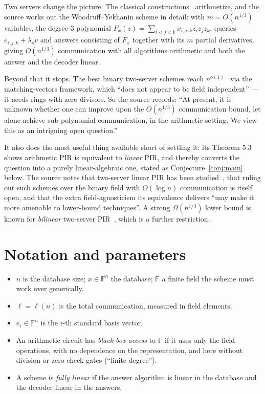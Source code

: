 \documentclass{aicr-conjecture}
\newcommand{\F}{\mathbb{F}}
\begin{document}
Two servers change the picture. The classical
constructions~\cite{CGKS95,BIK05,WY05} arithmetize, and the source works
out the Woodruff--Yekhanin scheme in detail: with $m = O(n^{1/3})$
variables, the degree-$3$ polynomial $F_{x}(z) = \sum_{i<j<k} x_{i,j,k}
z_{i} z_{j} z_{k}$, queries $e_{i,j,k} + \lambda_{s} v$ and answers
consisting of $F_{x}$ together with its $m$ partial derivatives, giving
$O(n^{1/3})$ communication with all algorithms arithmetic and both the
answer and the decoder linear.

Beyond that it stops. The best binary two-server schemes reach
$n^{o(1)}$~\cite{DG15,ABL25} via the matching-vectors framework, which
``does not appear to be field independent'' --- it needs rings with zero
divisors. So the source records: ``At present, it is unknown whether one
can improve upon the $O(n^{1/3})$ communication bound, let alone achieve
sub-polynomial communication, in the arithmetic setting. We view this as
an intriguing open question.''

It also does the most useful thing available short of settling it: its
Theorem 5.3 shows arithmetic PIR is equivalent to \emph{linear} PIR, and
thereby converts the question into a purely linear-algebraic one, stated
as Conjecture~\ref{conj:main} below. The source notes that two-server
linear PIR has been studied~\cite{GKST02,DS07}, that ruling out such
schemes over the binary field with $O(\log n)$ communication is itself
open, and that the extra field-agnosticism its equivalence delivers
``may make it more amenable to lower-bound techniques''. A strong
$\Omega(n^{1/3})$ lower bound is known for \emph{bilinear} two-server
PIR~\cite{Raz20}, which is a further restriction.

\section{Notation and parameters}\label{sec:notation}

\begin{itemize}[nosep]
  \item $n$ is the database size; $x \in \F^{n}$ the database; $\F$ a
    finite field the scheme must work over generically.
  \item $\ell = \ell(n)$ is the total communication, measured in field
    elements.
  \item $e_{i} \in \F^{n}$ is the $i$-th standard basis vector.
  \item An arithmetic circuit has \emph{black-box access} to $\F$ if it
    uses only the field operations, with no dependence on the
    representation, and here without division or zero-check gates
    (``finite degree'').
  \item A scheme is \emph{fully linear} if the answer algorithm is linear
    in the database and the decoder linear in the answers.
\end{itemize}
\end{document}
